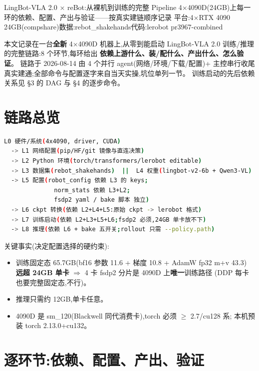 \documentclass[11pt]{ctexart}
\begin{document}
{LingBot-VLA 2.0 × reBot:从裸机到训练的完整 Pipeline}
{4$\times$4090D(24GB)上每一环的依赖、配置、产出与验证——按真实建链顺序记录}
{平台:4$\times$RTX 4090 24GB(compshare)\quad 数据:rebot\_shakehands\quad 代码:lerobot pr3967-combined}

\begin{cnabstract}
本文记录在一台\textbf{全新} 4$\times$4090D 机器上,从零到能启动
LingBot-VLA 2.0 训练/推理的完整链路:8 个环节,每环给出
\textbf{依赖上游什么、装/配什么、产出什么、怎么验证}。
链路于 2026-08-14 由 4 个并行 agent(网络/环境/下载/配置)+ 主控串行收尾
真实建通;全部命令与配置逐字来自当天实操,坑位单列一节。
训练启动的先后依赖关系见 §3 的 DAG 与 §4 的逐步命令。
\end{cnabstract}

\section{链路总览}
\begin{lstlisting}[language=bash,caption={八环依赖 DAG(|| 表示可并行)}]
L0 硬件/系统(4x4090, driver, CUDA)
  -> L1 网络配置(pip/HF/git 镜像与直连决策)
  -> L2 Python 环境(torch/transformers/lerobot editable)
  -> L3 数据集(rebot_shakehands)  ||  L4 权重(lingbot-v2-6b + Qwen3-VL)
  -> L5 配置(robot_config 依赖 L3 的 keys;
              norm_stats 依赖 L3+L2;
              fsdp2 yaml / bake 脚本 独立)
  -> L6 ckpt 转换(依赖 L2+L4+L5:原始 ckpt -> lerobot 格式)
  -> L7 训练启动(依赖 L2+L3+L5+L6;fsdp2 必须,24GB 单卡放不下)
  -> L8 推理(依赖 L6 + bake 五开关;rollout 只需 --policy.path)
\end{lstlisting}

关键事实(决定配置选择的硬约束):
\begin{itemize}
\item 训练固定态 65.7GB(bf16 参数 11.6 + 梯度 10.8 + AdamW fp32 m+v 43.3)
\textbf{远超 24GB 单卡} $\Rightarrow$ 4 卡 fsdp2 分片是 4090D 上\textbf{唯一}训练路径
(DDP 每卡也要完整固定态,不行)。
\item 推理只需约 12GB,单卡任意。
\item 4090D 是 sm\_120(Blackwell 同代消费卡),torch 必须 $\ge$ 2.7/cu128 系;
本机预装 torch 2.13.0+cu132。
\end{itemize}

\section{逐环节:依赖、配置、产出、验证}
\end{document}
